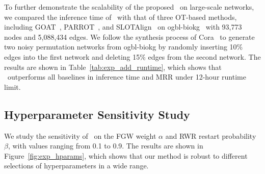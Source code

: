 To further demonstrate the scalability of the proposed \algname\ on large-scale networks, we compared the inference time of \algname\ with that of three OT-based methods, including GOAT~\cite{goat}, PARROT~\cite{parrot}, and SLOTAlign~\cite{slotalign} on ogbl-biokg~\cite{hu2020open} with 93,773 nodes and 5,088,434 edges. We follow the synthesis process of Cora~\cite{yang2016revisiting} to generate two noisy permutation networks from ogbl-biokg by randomly inserting 10\% edges into the first network and deleting 15\% edges from the second network. The results are shown in Table~\ref{tab:exp_add_runtime}, which shows that \algname\ outperforms all baselines in inference time and MRR under 12-hour runtime limit.

\vspace{-5pt}
\begin{table}[ht]
    \centering
    \caption{Scalability results on ogbl-biokg}
    \vspace{-5pt}
    \label{tab:exp_add_runtime}
\end{table}

\vspace{-10pt}
\subsection{Hyperparameter Sensitivity Study}
We study the sensitivity of \algname\ on the FGW weight $\alpha$ and RWR restart probability $\beta$, with values ranging from 0.1 to 0.9. The results are shown in Figure~\ref{fig:exp_hparams}, which shows that our method is robust to different selections of hyperparameters in a wide range.

